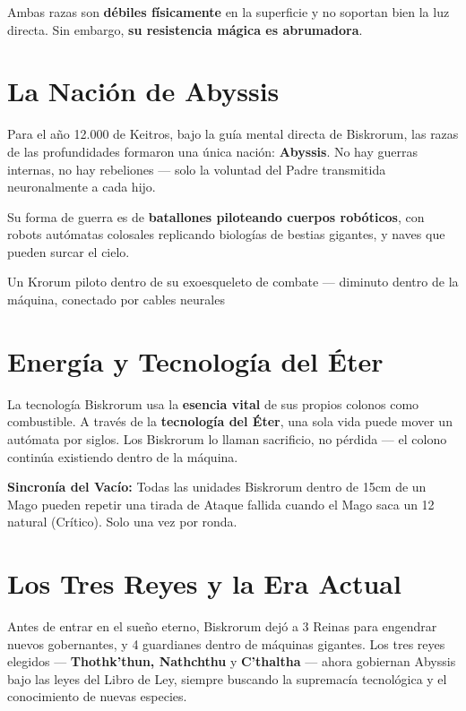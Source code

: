 Ambas razas son \textbf{débiles físicamente} en la superficie y no soportan bien la luz directa. Sin embargo, \textbf{su resistencia mágica es abrumadora}.

\section*{La Nación de Abyssis}

Para el año 12.000 de Keitros, bajo la guía mental directa de Biskrorum, las razas de las profundidades formaron una única nación: \textbf{Abyssis}. No hay guerras internas, no hay rebeliones — solo la voluntad del Padre transmitida neuronalmente a cada hijo.

Su forma de guerra es de \textbf{batallones piloteando cuerpos robóticos}, con robots autómatas colosales replicando biologías de bestias gigantes, y naves que pueden surcar el cielo.

\begin{imagebox}{Un Krorum piloto dentro de su exoesqueleto de combate — diminuto dentro de la máquina, conectado por cables neurales}
    \vspace{3cm}
\end{imagebox}

\section*{Energía y Tecnología del Éter}

La tecnología Biskrorum usa la \textbf{esencia vital} de sus propios colonos como combustible. A través de la \textbf{tecnología del Éter}, una sola vida puede mover un autómata por siglos. Los Biskrorum lo llaman sacrificio, no pérdida — el colono continúa existiendo dentro de la máquina.

\begin{pasivafaccion}
\textbf{Sincronía del Vacío:} Todas las unidades Biskrorum dentro de 15cm de un Mago pueden repetir una tirada de Ataque fallida cuando el Mago saca un 12 natural (Crítico). Solo una vez por ronda.
\end{pasivafaccion}

\section*{Los Tres Reyes y la Era Actual}

Antes de entrar en el sueño eterno, Biskrorum dejó a 3 Reinas para engendrar nuevos gobernantes, y 4 guardianes dentro de máquinas gigantes. Los tres reyes elegidos — \textbf{Thothk'thun, Nathchthu} y \textbf{C'thaltha} — ahora gobiernan Abyssis bajo las leyes del Libro de Ley, siempre buscando la supremacía tecnológica y el conocimiento de nuevas especies.


